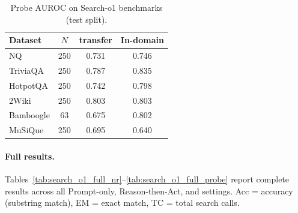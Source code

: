 \begin{table}[H]
\caption{Probe AUROC on Search-o1 benchmarks (test split).}
\label{tab:search_o1_auroc}
\centering
\small
\begin{tabular}{lccc}
\toprule
Dataset & $N$ & \benchmark{} transfer & In-domain \\
\midrule
NQ          & 250 & 0.731 & 0.746 \\
TriviaQA    & 250 & 0.787 & 0.835 \\
HotpotQA    & 250 & 0.742 & 0.798 \\
2Wiki       & 250 & 0.803 & 0.803 \\
Bamboogle   &  63 & 0.675 & 0.802 \\
MuSiQue     & 250 & 0.695 & 0.640 \\
\bottomrule
\end{tabular}
\end{table}

\paragraph{Full results.}
Tables~\ref{tab:search_o1_full_nr}--\ref{tab:search_o1_full_probe} report complete results across all Prompt-only, Reason-then-Act, and \method{} settings. Acc = accuracy (substring match), EM = exact match, TC = total search calls.


